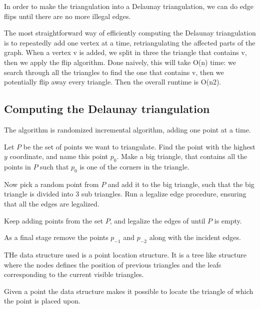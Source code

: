 \documentclass[10pt]{article}
\begin{document}
In order to make the triangulation into a Delaunay triangulation, we can do edge flips until there are no more illegal edges.


The most straightforward way of efficiently computing the Delaunay triangulation is to repeatedly add one vertex at a time, retriangulating the affected parts of the graph. When a vertex v is added, we split in three the triangle that contains v, then we apply the flip algorithm. Done naively, this will take O(n) time: we search through all the triangles to find the one that contains v, then we potentially flip away every triangle. Then the overall runtime is O(n2).



\subsection{Computing the Delaunay triangulation} %
\label{sub:computing_the_delaunay_triangulation}
The algorithm is randomized incremental algorithm, adding one point at a time.

Let $P$ be the set of points we want to triangulate. Find the point with the highest $y$ coordinate, and name this point $p_0$. Make a big triangle, that contains all the points in $P$ such that $p_0$ is one of the corners in the triangle. 

Now pick a random point from $P$ and add it to the big triangle, such that the big triangle is divided into $3$ sub triangles. Run a legalize edge procedure, ensuring that all the edges are legalized.

Keep adding points from the set $P$, and legalize the edges of until $P$ is empty. 

As a final stage remove the points $p_{-1}$ and $p_{-2}$ along with the incident edges. 

THe data structure used is a point location structure. It is a tree like structure where the nodes defines the position of previous triangles and the leafs corresponding to the current visible triangles. 

Given a point the data structure makes it possible to locate the triangle of which the point is placed upon. 
\end{document}
